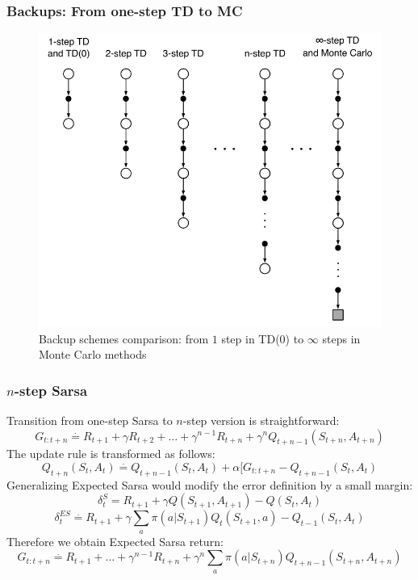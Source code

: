 \documentclass{beamer}
\begin{document}
\begin{frame}
  \frametitle{Backups: From one-step TD to MC}
  \begin{figure}
    \centering
    \includegraphics[height=0.7 \textheight]{one_step_to_multi_step}
    \caption{Backup schemes comparison: from $1$ step in TD(0) to $\infty$
      steps in Monte Carlo methods}
  \end{figure}
\end{frame}

\begin{frame}
  \frametitle{$n$-step Sarsa}
  Transition from one-step Sarsa to $n$-step version is straightforward:
  $$G_{t : t + n} \overset{\cdot}{=} R_{t + 1} + \gamma R_{t + 2} + \ldots +
    \gamma^{n -1} R_{t + n} + \gamma^n Q_{t + n - 1}(S_{t + n}, A_{t + n})$$
  The update rule is transformed as follows:
  $$Q_{t + n}(S_t, A_t) \overset{\cdot}{=} Q_{t + n - 1}(S_t, A_t) +
    \alpha [G_{t : t + n} - Q_{t + n - 1}(S_t, A_t)$$
  Generalizing Expected Sarsa would modify the error definition by a small
  margin:
  $$\delta^{S}_t = R_{t + 1} + \gamma Q(S_{t + 1}, A_{t + 1}) - Q(S_t, A_t)$$
  $$\delta^{ES}_t \overset{\cdot}{=} R_{t + 1} +
    \gamma \sum_{a} \pi(a | S_{t + 1}) Q_t(S_{t + 1}, a) - Q_{t - 1}(S_t, A_t)$$
  Therefore we obtain Expected Sarsa return:
  $$G_{t : t + n} \overset{\cdot}{=} R_{t + 1} + \ldots +
    \gamma^{n -1} R_{t + n} + \gamma^n \sum_{a} \pi(a | S_{t + n})
      Q_{t + n - 1}(S_{t + n}, A_{t + n})$$
\end{frame}
\end{document}
